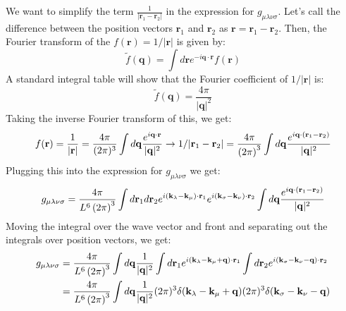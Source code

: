 \documentclass[12pt]{article}
\begin{document}
We want to simplify the term $\frac{1}{|\mathbf{r}_1 - \mathbf{r}_2|}$ in the expression for $g_{\mu\lambda\nu\sigma}$.
Let's call the difference between the position vectors $\mathbf{r}_1$ and $\mathbf{r}_2$ as $\mathbf{r} = \mathbf{r}_1 - \mathbf{r}_2$. Then, the Fourier transform of the $f(\mathbf{r}) = 1/|\mathbf{r}|$ is given by:
\begin{equation}
    \tilde{f}(\mathbf{q})
= \int d\mathbf{r} e^{-i \mathbf{q}\cdot\mathbf{r}} f(\mathbf{r})
\end{equation}
A standard integral table will show that the Fourier coefficient of $1/|\mathbf{r}|$ is:
\begin{equation}
    \tilde{f}(\mathbf{q}) = \frac{4\pi}{|\mathbf{q}|^2}
\end{equation}
Taking the inverse Fourier transform of this, we get:
\begin{equation}
    f(\mathbf{r}) = \frac{1}{|\mathbf{r}|} = \frac{4\pi}{(2\pi)^3} \int d\mathbf{q} \frac{e^{i\mathbf{q}\cdot\mathbf{r}}}{|\mathbf{q}|^2} \rightarrow  1/|\mathbf{r}_1 - \mathbf{r}_2| = \frac{4\pi}{\left(2\pi\right)^3} \int d\mathbf{q} \frac{e^{i\mathbf{q}\cdot\left(\mathbf{r}_1 - \mathbf{r}_2\right)}}{|\vb{q}|^2}
\end{equation}
Plugging this into the expression for $g_{\mu\lambda\nu\sigma}$ we get:
\begin{equation}
\begin{aligned}
    g_{\mu\lambda\nu\sigma} &= \frac{4\pi}{L^6\left(2\pi\right)^3} \int d\mathbf{r}_1 d\mathbf{r}_2 e^{i(\mathbf{k}_\lambda - \mathbf{k}_\mu)\cdot\mathbf{r}_1} e^{i(\mathbf{k}_\sigma - \mathbf{k}_\nu)\cdot\mathbf{r}_2} \int d\mathbf{q} \frac{e^{i\mathbf{q}\cdot\left(\mathbf{r}_1 - \mathbf{r}_2\right)}}{|\vb{q}|^2} \\
\end{aligned}
\end{equation}
Moving the integral over the wave vector and front and separating out the integrals over position vectors, we get:
\begin{equation}
\begin{aligned}
    g_{\mu\lambda\nu\sigma} &= \frac{4\pi}{L^6\left(2\pi\right)^3} \int d\mathbf{q} \frac{1}{|\vb{q}|^2} \int d\mathbf{r}_1 e^{i(\mathbf{k}_\lambda - \mathbf{k}_\mu + \mathbf{q})\cdot\mathbf{r}_1} \int d\mathbf{r}_2 e^{i(\mathbf{k}_\sigma - \mathbf{k}_\nu - \mathbf{q})\cdot\mathbf{r}_2} \\
    &= \frac{4\pi}{L^6\left(2\pi\right)^3} \int d\mathbf{q} \frac{1}{|\vb{q}|^2} (2\pi)^3 \delta(\mathbf{k}_\lambda - \mathbf{k}_\mu + \mathbf{q}) (2\pi)^3 \delta(\mathbf{k}_\sigma - \mathbf{k}_\nu - \mathbf{q}) \\
\end{aligned}
\end{equation}
\end{document}
